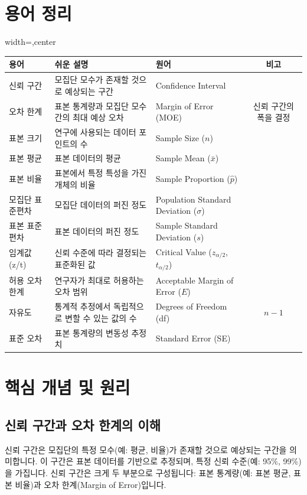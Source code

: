 \documentclass[11pt,a4paper]{article}
\theoremstyle{definition}
\begin{document}
\begin{enumerate}
\begin{enumerate}
\newpage
\section{용어 정리}

\begin{adjustbox}{width=\textwidth,center}
\begin{tabular}{lllc}
\toprule
\textbf{용어} & \textbf{쉬운 설명} & \textbf{원어} & \textbf{비고} \\
\midrule
신뢰 구간 & 모집단 모수가 존재할 것으로 예상되는 구간 & Confidence Interval & \\
오차 한계 & 표본 통계량과 모집단 모수 간의 최대 예상 오차 & Margin of Error (MOE) & 신뢰 구간의 폭을 결정 \\
표본 크기 & 연구에 사용되는 데이터 포인트의 수 & Sample Size (\(n\)) & \\
표본 평균 & 표본 데이터의 평균 & Sample Mean (\(\bar{x}\)) & \\
표본 비율 & 표본에서 특정 특성을 가진 개체의 비율 & Sample Proportion (\(\hat{p}\)) & \\
모집단 표준편차 & 모집단 데이터의 퍼진 정도 & Population Standard Deviation (\(\sigma\)) & \\
표본 표준편차 & 표본 데이터의 퍼진 정도 & Sample Standard Deviation (\(s\)) & \\
임계값 (z/t) & 신뢰 수준에 따라 결정되는 표준화된 값 & Critical Value (\(z_{\alpha/2}\), \(t_{\alpha/2}\)) & \\
허용 오차 한계 & 연구자가 최대로 허용하는 오차 범위 & Acceptable Margin of Error (\(E\)) & \\
자유도 & 통계적 추정에서 독립적으로 변할 수 있는 값의 수 & Degrees of Freedom (df) & \(n-1\) \\
표준 오차 & 표본 통계량의 변동성 추정치 & Standard Error (SE) & \\
\bottomrule
\end{tabular}
\end{adjustbox}

\section{핵심 개념 및 원리}

\subsection{신뢰 구간과 오차 한계의 이해}
신뢰 구간은 모집단의 특정 모수(예: 평균, 비율)가 존재할 것으로 예상되는 구간을 의미합니다. 이 구간은 표본 데이터를 기반으로 추정되며, 특정 신뢰 수준(예: 95\%, 99\%)을 가집니다. 신뢰 구간은 크게 두 부분으로 구성됩니다: 표본 통계량(예: 표본 평균, 표본 비율)과 오차 한계(Margin of Error)입니다.


\end{enumerate}
\end{enumerate}
\end{document}
